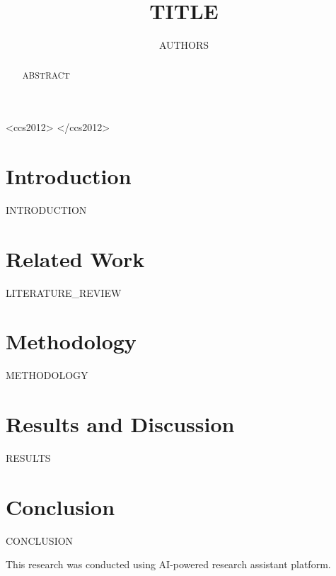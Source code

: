 \documentclass[sigconf]{acmart}
\begin{document}
\title{{{TITLE}}}

\author{{{AUTHORS}}}

\begin{abstract}
{{ABSTRACT}}
\end{abstract}

\begin{CCSXML}
<ccs2012>
</ccs2012>
\end{CCSXML}



\maketitle

\section{Introduction}
{{INTRODUCTION}}

\section{Related Work}
{{LITERATURE_REVIEW}}

\section{Methodology}
{{METHODOLOGY}}

\section{Results and Discussion}
{{RESULTS}}

\section{Conclusion}
{{CONCLUSION}}

\begin{acks}
This research was conducted using AI-powered research assistant platform.
\end{acks}



\end{document}
